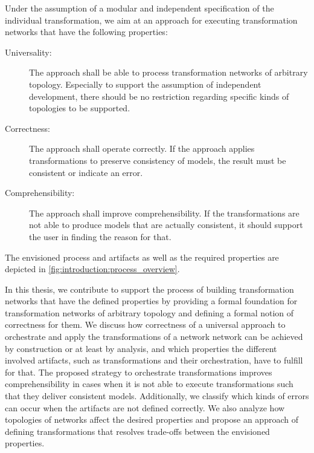 Under the assumption of a modular and independent specification of the individual transformation, we aim at an approach for executing transformation networks that have the following properties:
\begin{description}
    \item[Universality:] The approach shall be able to process transformation networks of arbitrary topology. Especially to support the assumption of independent development, there should be no restriction regarding specific kinds of topologies to be supported.
    \item[Correctness:] The approach shall operate correctly. If the approach applies transformations to preserve consistency of models, the result must be consistent or indicate an error.
    \item[Comprehensibility:] The approach shall improve comprehensibility. If the transformations are not able to produce models that are actually consistent, it should support the user in finding the reason for that.
\end{description}
The envisioned process and artifacts as well as the required properties are depicted in \autoref{fig:introduction:process_overview}.

In this thesis, we contribute to support the process of building transformation networks that have the defined properties by providing a formal foundation for transformation networks of arbitrary topology and defining a formal notion of correctness for them.
We discuss how correctness of a universal approach to orchestrate and apply the transformations of a network network can be achieved by construction or at least by analysis, and which properties the different involved artifacts, such as transformations and their orchestration, have to fulfill for that.
The proposed strategy to orchestrate transformations improves comprehensibility in cases when it is not able to execute transformations such that they deliver consistent models.
Additionally, we classify which kinds of errors can occur when the artifacts are not defined correctly.
We also analyze how topologies of networks affect the desired properties and propose an approach of defining transformations that resolves trade-offs between the envisioned properties.


